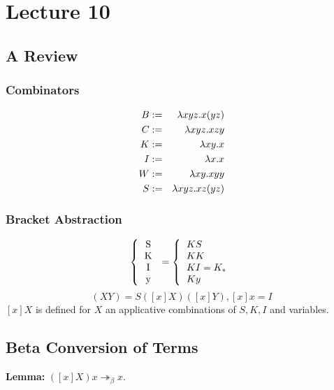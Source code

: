 \chapter{Lecture 10}
\pagestyle{fancy}

\section{A Review}
\subsection{Combinators}
\begin{eqnarray*}
  B &:=& \lambda xyz . x(yz)\\
  C &:=& \lambda xyz . xzy\\
  K &:=& \lambda xy . x\\
  I &:=& \lambda x .x\\
  W &:=& \lambda xy . xyy\\
  S &:=& \lambda xyz . xz(yz)
\end{eqnarray*}
\subsection{Bracket Abstraction}
\begin{equation*}
  [x] \left\{
  \begin{tabular}{c}
    S\\K\\I\\y
  \end{tabular}
  \right. = \left\{
  \begin{tabular}{l}
   $KS$\\$KK$\\$KI = K_*$\\$Ky$
  \end{tabular}
  \right.
\end{equation*}
\begin{equation*}
  [x](XY) = S([x]X)([x]Y), [x]x = I
\end{equation*}
$[x]X$ is defined for $X$ an applicative combinations of $S, K, I$ and variables.\\

\section{Beta Conversion of Terms}
\textbf{Lemma:} $([x]X)x \twoheadrightarrow_\beta x$.\\

